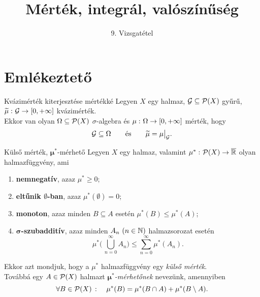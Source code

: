 \documentclass[
]{elteikthesis}[2024/04/26]
\title{Mérték, integrál, valószínűség} %
\subtitle{9. Vizsgatétel}
\begin{document}
	
	
	\section{Emlékeztető}
		
	\begin{theorem}{Kvázimérték kiterjesztése mértékké}{}
		Legyen \( X \) egy halmaz, 
		\( \mathcal{G} \subseteq \mathcal{P}( X ) \) gyűrű, 
		\( \widetilde{\mu}  \,\colon  \mathcal{G}  \to  [0, +\infty] \) kvázimérték.\\[6pt]
		Ekkor van olyan \( \Omega \subseteq \mathcal{P}( X ) \) \( \sigma \)-algebra és 
		\( \mu  \,\colon  \Omega  \to  [0, +\infty] \) mérték, hogy 
		\[
			\ring{G} \subseteq \Omega
			\qquad \text{és} \qquad
			\widetilde{\mu} = \restr{\mu}{\ring{G}}.
		\]
	\end{theorem}
	
	\begin{definition}{Külső mérték, \( \boldsymbol{\mu^*} \)-mérhető}{}
		Legyen \( X \) egy halmaz, 
		valamint \( \mu^* \,\colon  \mathcal{P}( X )  \to  \overline{\mathbb{R}} \) olyan halmazfüggvény, ami
		\begin{enumerate}
			\item 
			\textbf{nemnegatív}, azaz \( \mu^* \geq 0 \);
			
			\item 
			\textbf{eltűnik \( \boldsymbol{\emptyset} \)-ban}, azaz
			\( \mu^*(\emptyset) = 0 \);
			
			\item 
			\textbf{monoton}, 
			azaz minden \( B \subseteq A \) esetén \( \mu^*(B) \leq \mu^*(A) \);
			
			\item
			\textbf{\( \boldsymbol{\sigma}\)-szubadditív}, 
			azaz minden \( A_n \ (n \in \mathbb{N} ) \) halmazsorozat esetén
			\[
			\mu^* \Biggl( \, \bigcup\limits_{n=0}^\infty A_n \Biggr) \leq 
			\sum\limits_{n=0}^{\infty} \mu^*(A_n).
			\]
		\end{enumerate}
		Ekkor azt mondjuk, hogy a \( \mu^* \) halmazfüggvény egy \emph{külső mérték}.\\[6pt]
		Továbbá egy \( A \in \mathcal{P}( X ) \) halmazt \emph{\( \boldsymbol{\mu^*} \)-mérhetőnek}
		nevezünk, amennyiben
		\[
			\forall B \in \mathcal{P}( X ) \ \colon \quad
			\mu^*(B) = \mu^*(B \cap A) + \mu^*(B \setminus A).
		\]
	\end{definition}
	
\end{document}
